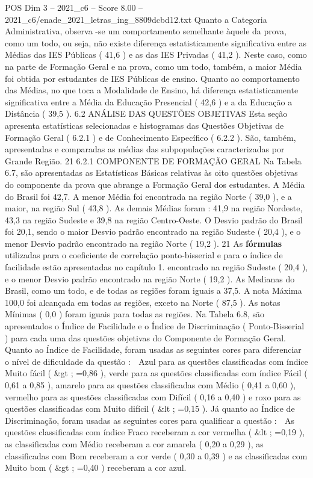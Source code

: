 \begin{textsample}{POS Dim 3 – 2021\_c6 – Score 8.00 – 2021\_c6/enade\_2021\_letras\_ing\_8809dcbd12.txt}
Quanto a Categoria Administrativa, observa -se um comportamento semelhante àquele da prova, como um todo, ou seja, não existe diferença estatisticamente significativa entre as Médias das IES Públicas ( 41,6 ) e as das IES Privadas ( 41,2 ).
Neste caso, como na parte de Formação Geral e na prova, como um todo, também, a maior Média foi obtida por estudantes de IES Públicas de ensino.
Quanto ao comportamento das Médias, no que toca a Modalidade de Ensino, há diferença estatisticamente significativa entre a Média da Educação Presencial ( 42,6 ) e a da Educação a Distância ( 39,5 ). 6.2 ANÁLISE DAS QUESTÕES OBJETIVAS Esta seção apresenta estatísticas selecionadas e histogramas das Questões Objetivas de Formação Geral ( 6.2.1 ) e de Conhecimento Específico ( 6.2.2 ).
São, também, apresentadas e comparadas as médias das subpopulações caracterizadas por Grande Região. 21 6.2.1 COMPONENTE DE FORMAÇÃO GERAL Na Tabela 6.7, são apresentadas as Estatísticas Básicas relativas às oito questões objetivas do componente da prova que abrange a Formação Geral dos estudantes.
A Média do Brasil foi 42,7.
A menor Média foi encontrada na região Norte ( 39,0 ), e a maior, na região Sul ( 43,8 ).
As demais Médias foram : 41,9 na região Nordeste, 43,3 na região Sudeste e 39,8 na região Centro-Oeste.
O Desvio padrão do Brasil foi 20,1, sendo o maior Desvio padrão encontrado na região Sudeste ( 20,4 ), e o menor Desvio padrão encontrado na região Norte ( 19,2 ). 21 As \textbf{fórmulas} utilizadas para o coeficiente de correlação ponto-bisserial e para o índice de facilidade estão apresentadas no capítulo 1. encontrado na região Sudeste ( 20,4 ), e o menor Desvio padrão encontrado na região Norte ( 19,2 ).
As Medianas do Brasil, como um todo, e de todas as regiões foram iguais a 37,5.
A nota Máxima 100,0 foi alcançada em todas as regiões, exceto na Norte ( 87,5 ).
As notas Mínimas ( 0,0 ) foram iguais para todas as regiões.
Na Tabela 6.8, são apresentados o Índice de Facilidade e o Índice de Discriminação ( Ponto-Bisserial ) para cada uma das questões objetivas do Componente de Formação Geral.
Quanto ao Índice de Facilidade, foram usadas as seguintes cores para diferenciar o nível de dificuldade da questão :  Azul para as questões classificadas com índice Muito fácil ( \&gt ; =0,86 ), verde para as questões classificadas com índice Fácil ( 0,61 a 0,85 ), amarelo para as questões classificadas com Médio ( 0,41 a 0,60 ), vermelho para as questões classificadas com Difícil ( 0,16 a 0,40 ) e roxo para as questões classificadas com Muito difícil ( \&lt ; =0,15 ).
Já quanto ao Índice de Discriminação, foram usadas as seguintes cores para qualificar a questão :  As questões classificadas com índice Fraco receberam a cor vermelha ( \&lt ; =0,19 ), as classificadas com Médio receberam a cor amarela ( 0,20 a 0,29 ), as classificadas com Bom receberam a cor verde ( 0,30 a 0,39 ) e as classificadas com Muito bom ( \&gt ; =0,40 ) receberam a cor azul.

\end{textsample}

